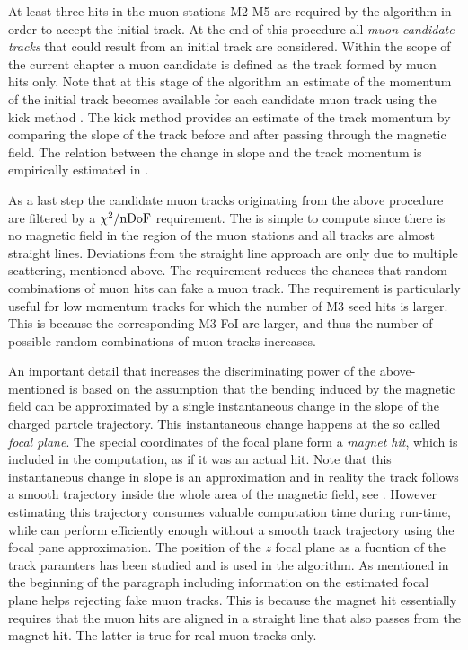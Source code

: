 At least three hits in the muon stations M2-M5 are required by the \mvm algorithm in order to accept the initial \velo track.
At the end of this procedure all {\it muon candidate tracks} that could result from an initial \velo track are considered.
Within the scope of the current chapter a muon candidate is defined as the track formed by muon hits only.
Note that at this stage of the algorithm an estimate of the momentum of the initial \velo track becomes available
for each candidate muon track using the kick method \cite{Hommels:999327}. The kick method provides an estimate
of the track momentum by comparing the slope of the track before and after passing through the \lhcb magnetic
field. The relation between the change in slope and the track momentum is empirically estimated in \cite{roelThesis}.

As a last step the candidate muon tracks originating from the above procedure are filtered by a $\chi^2/\rm nDoF$
requirement. The \chisq is simple to compute since there is no magnetic field in the region of the muon stations
and all tracks are almost straight lines. Deviations from the straight line approach are only due to
multiple scattering, mentioned above. The \chisq requirement reduces the chances that random combinations of muon hits
can fake a muon track. The requirement is particularly useful for low momentum tracks for which the number
of M3 seed hits is larger. This is because the corresponding M3 FoI are larger, and thus the number of possible
random combinations of muon tracks increases.

An important detail that increases the discriminating power of the above-mentioned \chisq is based on the
assumption that the bending induced by the \lhcb magnetic field can be approximated by a single instantaneous
change in the slope of the charged partcle trajectory. This instantaneous change happens at the so called
{\it focal plane}. The special coordinates of the focal plane form a {\it magnet hit}, which is included in
the \chisq computation, as if it was an actual hit. Note that this instantaneous change in slope is an approximation
and in reality the track follows a smooth trajectory inside the whole area of the magnetic field, see .
However estimating this trajectory consumes valuable computation time during \hltone run-time, while \mvm can perform
efficiently enough without a smooth track trajectory using the focal
pane approximation. The position of the $z$ focal plane as a fucntion of the track paramters has been studied
\cite{Hommels:999327} and is used in the \mvm algorithm. As mentioned in the beginning of the paragraph including
information on the estimated focal plane helps rejecting fake muon tracks.
This is because the magnet hit essentially requires that the muon hits are aligned in a straight line that
also passes from the magnet hit. The latter is true for real muon tracks only.

